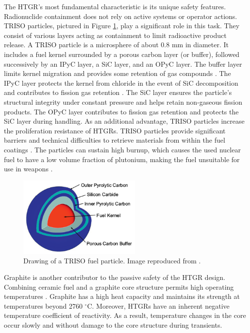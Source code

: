 The HTGR's most fundamental characteristic is its unique safety features.
Radionuclide containment does not rely on active systems or operator actions.
\gls{TRISO} particles, pictured in Figure \ref{fig:triso}, play a significant role in this task.
They consist of various layers acting as containment to limit radioactive product release.
A \gls{TRISO} particle is a microsphere of about 0.8 mm in diameter.
It includes a fuel kernel surrounded by a porous carbon layer (or buffer), followed successively by an \gls{IPyC} layer, a \gls{SiC} layer, and an \gls{OPyC} layer.
The buffer layer limits kernel migration and provides some retention of gas compounds \cite{oecd_nea_benchmark_2017}.
The \gls{IPyC} layer protects the kernel from chloride in the event of \gls{SiC} decomposition and contributes to fission gas retention \cite{demkowickz_triso_2019}.
The \gls{SiC} layer ensures the particle's structural integrity under constant pressure and helps retain non-gaseous fission products.
The \gls{OPyC} layer contributes to fission gas retention and protects the \gls{SiC} layer during handling.
As an additional advantage, \gls{TRISO} particles increase the proliferation resistance of \glspl{HTGR}.
TRISO particles provide significant barriers and technical difficulties to retrieve materials from within the fuel coatings \cite{paviet-hartmann_analysis_2011}.
The particles can sustain high burnup, which causes the used nuclear fuel to have a low volume fraction of plutonium, making the fuel unsuitable for use in weapons \cite{paviet-hartmann_analysis_2011}.

\begin{figure}[htbp!]
	\centering
	\includegraphics[height=4.0cm]{figures/triso}
	\caption{Drawing of a TRISO fuel particle. Image reproduced from \cite{hales_multidimensional_2013}.}
	\label{fig:triso}
\end{figure}

Graphite is another contributor to the passive safety of the \gls{HTGR} design.
Combining ceramic fuel and a graphite core structure permits high operating temperatures \cite{ballinger_balance_2004}.
Graphite has a high heat capacity and maintains its strength at temperatures beyond 2760 $^{\circ}$C.
Moreover, HTGRs have an inherent negative temperature coefficient of reactivity.
As a result, temperature changes in the core occur slowly and without damage to the core structure during transients.

